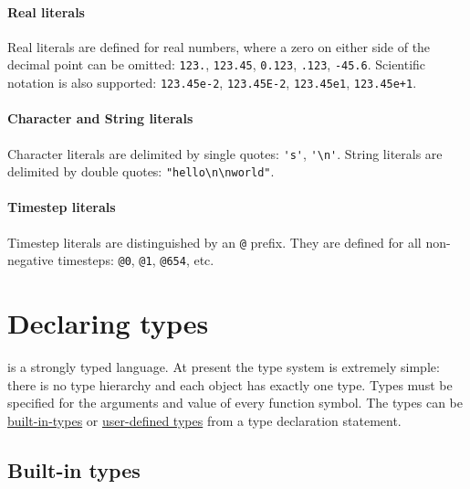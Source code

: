 \documentclass[12pt]{article}
\begin{document}
\paragraph{Real literals}
Real literals are defined for real numbers, where a zero on either side of the
decimal point can be omitted: \verb|123.|, \verb|123.45|, \verb|0.123|,
\verb|.123|, \verb|-45.6|. Scientific notation is also supported:
\verb|123.45e-2|, \verb|123.45E-2|, \verb|123.45e1|, \verb|123.45e+1|.

\paragraph{Character and String literals}
Character literals are delimited by single quotes: \verb|'s'|, \verb|'\n'|.
String literals are delimited by double quotes: \verb|"hello\n\nworld"|.

\paragraph{Timestep literals}
Timestep literals are distinguished by an \verb|@| prefix. They are defined for
all non-negative timesteps: \verb|@0|, \verb|@1|, \verb|@654|, etc.

\section{Declaring types}\label{type-declaration-section}

\bl is a strongly typed language. At present the type system is extremely simple: there is no type hierarchy
and each object has exactly one type. Types must be specified for the arguments and value of every function symbol.
The types can be \hyperref[builtin-type-section]{built-in-types} or \hyperref[user-type-section]{user-defined types} from a type declaration statement.


\subsection{Built-in types}\label{builtin-type-section}
\end{document}
